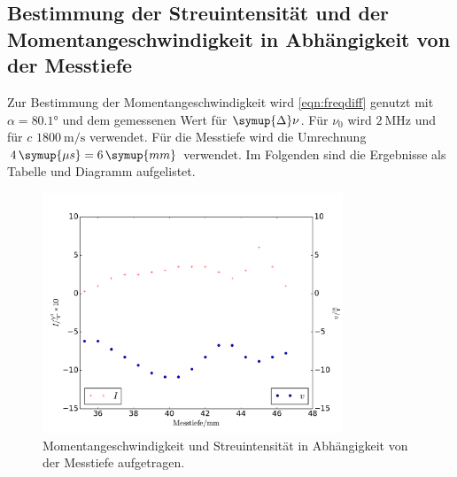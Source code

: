 \documentclass[
  bibliography=totoc,     %
  captions=tableheading,  %
  titlepage=firstiscover, %
]{scrartcl}
\begin{document}
    \subsection{Bestimmung der Streuintensität und der Momentangeschwindigkeit
    in
      Abhängigkeit von der Messtiefe}
      Zur Bestimmung der Momentangeschwindigkeit wird \eqref{eqn:freqdiff} genutzt mit
      $\alpha = 80.1°$ und dem gemessenen Wert für $\symup{\Delta} \nu$. Für
      $\nu_0$
      wird $\SI{2}{\mega\hertz}$ und für $c$
      $\SI{1800}{\meter\per\second}$ verwendet. Für die Messtiefe wird die
      Umrechnung
         $4 \, \symup{\mu s} = 6 \, \symup{mm}$
      verwendet. Im Folgenden sind die Ergebnisse als
      Tabelle und Diagramm aufgelistet.

      \begin{figure}
        \centering
        \includegraphics[width=0.8\textwidth]{b45.pdf}
        \caption{Momentangeschwindigkeit und Streuintensität in Abhängigkeit
        von der Messtiefe aufgetragen.}
        \label{fig:4}
      \end{figure}
\end{document}
